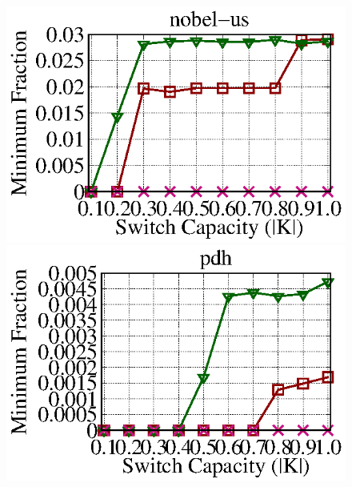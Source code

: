 \documentclass[a4paper,12pt]{report}
\begin{document}
\begin{CJK*}{UTF8}{bkai}
\begin{large}
\begin{figure}[ht]
	  \includegraphics[width=1.0\textwidth]{nobel-us_geni_lambda_e05.eps}
	  \includegraphics[width=1.0\textwidth]{pdh_geni_lambda_e05.eps}
  \end{figure}
  
  
  

\end{large}
\end{CJK*}
\end{document}
